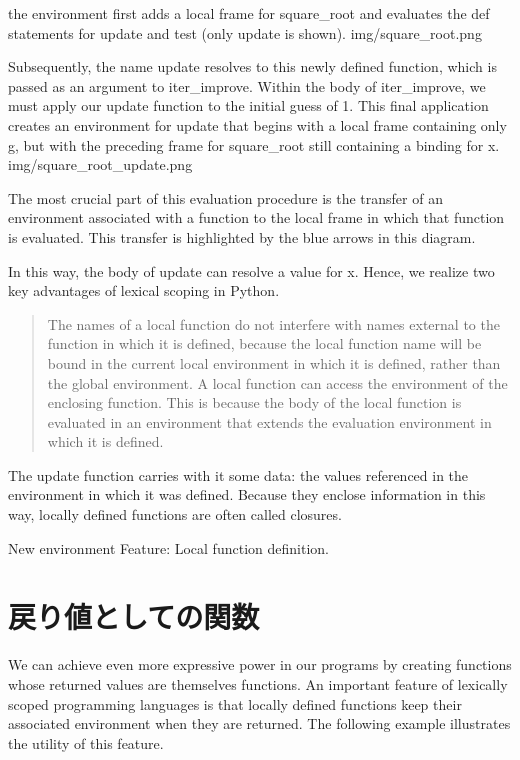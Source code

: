 \documentclass[letterpaper,10pt,dvipdfmx]{sphinxmanual}
\begin{document}
the environment first adds a local frame for square\_root and evaluates the def statements for update and test (only update is shown).
img/square\_root.png

Subsequently, the name update resolves to this newly defined function, which is passed as an argument to iter\_improve. Within the body of iter\_improve, we must apply our update function to the initial guess of 1. This final application creates an environment for update that begins with a local frame containing only g, but with the preceding frame for square\_root still containing a binding for x.
img/square\_root\_update.png

The most crucial part of this evaluation procedure is the transfer of an environment associated with a function to the local frame in which that function is evaluated. This transfer is highlighted by the blue arrows in this diagram.

In this way, the body of update can resolve a value for x. Hence, we realize two key advantages of lexical scoping in Python.
\begin{quote}

The names of a local function do not interfere with names external to the function in which it is defined, because the local function name will be bound in the current local environment in which it is defined, rather than the global environment.
A local function can access the environment of the enclosing function. This is because the body of the local function is evaluated in an environment that extends the evaluation environment in which it is defined.
\end{quote}

The update function carries with it some data: the values referenced in the environment in which it was defined. Because they enclose information in this way, locally defined functions are often called closures.

New environment Feature: Local function definition.


\section{戻り値としての関数}
\label{functions:id33}
We can achieve even more expressive power in our programs by creating functions whose returned values are themselves functions. An important feature of lexically scoped programming languages is that locally defined functions keep their associated environment when they are returned. The following example illustrates the utility of this feature.
\end{document}
